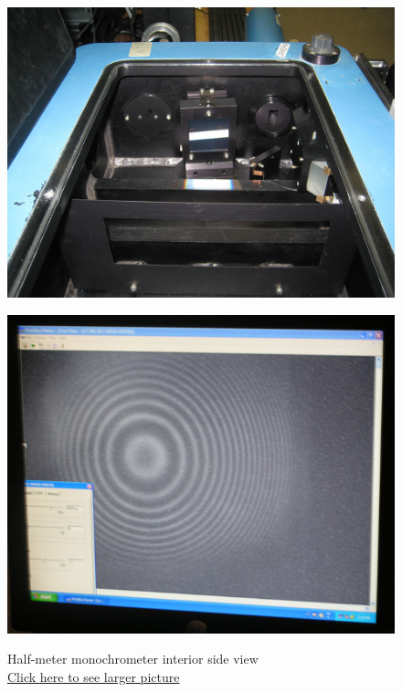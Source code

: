 \documentclass{../lab}
\begin{document}
\begin{figure}[!h]
  \href{http://experimentationlab.berkeley.edu/sites/default/files/images/ATM-mono-Grating_3500-Lg.jpg}{\includegraphics[width=\linewidth,keepaspectratio]{images/ATM-mono-Grating_3500-Lg.jpg}}
  \caption{Half-meter monochrometer interior side view\\ \href{http://experimentationlab.berkeley.edu/sites/default/files/images/ATM-mono-Grating_3500-Lg.jpg}{Click here to see larger picture}}
  \label{fig:MonochrometerInteriorSide}
\endminipage\hfill
{}
  \href{http://experimentationlab.berkeley.edu/sites/default/files/images/Atm_5.jpg}{\includegraphics[width=\linewidth,keepaspectratio]{images/Atm_5.jpg}}

\end{figure}
\end{document}
